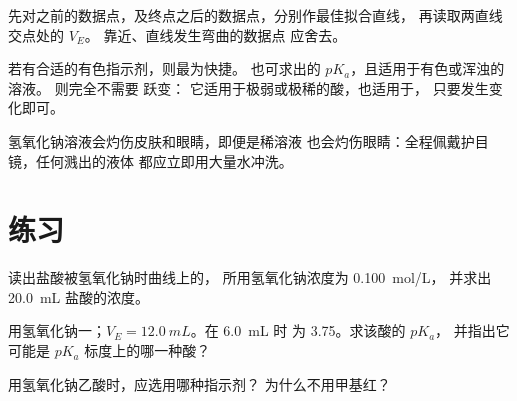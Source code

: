 \begin{method}[由电导滴定确定滴定终点]\label{met:g12:ph-conductivity-titrations:two-lines}
先对之前的数据点，及终点之后的数据点，分别作最佳拟合直线，
再读取两直线交点处的 $V_E$。
靠近、直线发生弯曲的数据点
应舍去。
\end{method}

\begin{remark}[何时选用何种方法]\label{rem:g12:ph-conductivity-titrations:which}
若有合适的有色指示剂，则最为快捷。 
也可求出的 $pK_a$，且适用于有色或浑浊的溶液。
则完全不需要  跃变：
它适用于极弱或极稀的酸，也适用于，
只要发生变化即可。
\end{remark}

\begin{safety}{}
氢氧化钠溶液会灼伤皮肤和眼睛，即便是稀溶液
  也会灼伤眼睛：全程佩戴护目镜，任何溅出的液体
都应立即用大量水冲洗。
\end{safety}

\section{练习}


\begin{exercise}[$\star$]\label{exo:g12:ph-conductivity-titrations:1}
读出盐酸被氢氧化钠时曲线上的，
所用氢氧化钠浓度为 \qty{0.100}{mol/L}，
并求出 \qty{20.0}{mL} 盐酸的浓度。
\end{exercise}

\begin{exercise}[$\star$]\label{exo:g12:ph-conductivity-titrations:2}
用氢氧化钠一；$V_E = \qty{12.0}{mL}$。在
\qty{6.0}{mL} 时  为 3.75。求该酸的 $pK_a$，
并指出它可能是 $pK_a$ 标度上的哪一种酸？
\end{exercise}

\begin{exercise}[$\star$]\label{exo:g12:ph-conductivity-titrations:3}
用氢氧化钠乙酸时，应选用哪种指示剂？
为什么不用甲基红？
\end{exercise}

